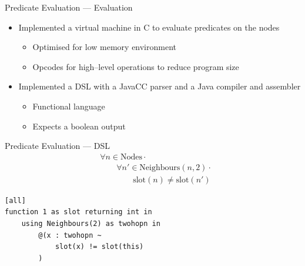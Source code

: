 \documentclass[usenames,dvipsnames]{beamer}
\begin{document}
\begin{frame}{Predicate Evaluation --- Evaluation}
\begin{itemize}
	\item Implemented a virtual machine in C to evaluate predicates on the nodes
		\begin{itemize}
			\item Optimised for low memory environment
			\item Opcodes for high--level operations to reduce program size
		\end{itemize}
	\vspace{1em}
	\item Implemented a DSL with a JavaCC parser and a Java compiler and assembler
		\begin{itemize}
			\item Functional language
			\item Expects a boolean output
		\end{itemize}
\end{itemize}
\end{frame}


\begin{frame}[fragile]{Predicate Evaluation --- DSL}
\begin{align*}
&				\forall n \in \text{Nodes} \cdot \\
& \hspace{2em}		\forall n' \in \text{Neighbours}(n, 2) \cdot \\
& \hspace{4em}				\text{slot}(n) \neq \text{slot}(n')
\end{align*}

\begin{center}
\begin{minipage}{0.75\textwidth}
\begin{lstlisting}[language=Hoppy]
[all]
function 1 as slot returning int in
    using Neighbours(2) as twohopn in
        @(x : twohopn ~
            slot(x) != slot(this)
        )
\end{lstlisting}
\end{minipage}
\end{center}

\end{frame}
\end{document}
